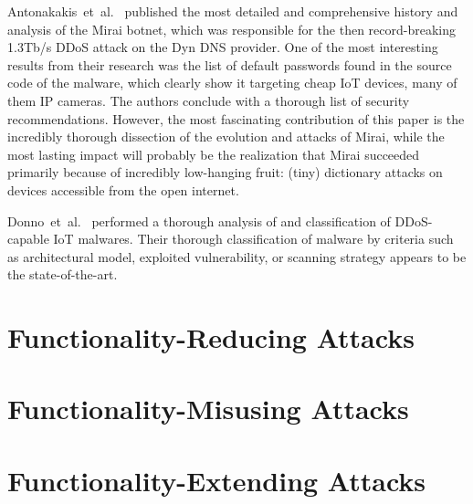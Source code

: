 \documentclass[11pt,a4paper]{article}
\begin{document}
	Antonakakis~et~al.~\cite{Antonakakis:2017:UMB} %
	published the most detailed and comprehensive history and analysis of the Mirai botnet, which was responsible for the then record-breaking 1.3Tb/s DDoS attack on the Dyn DNS provider.
	One of the most interesting results from their research was the list of default passwords found in the source code of the malware, which clearly show it targeting cheap IoT devices, many of them IP cameras.
	The authors conclude with a thorough list of security recommendations.
	However, the most fascinating contribution of this paper is the incredibly thorough dissection of the evolution and attacks of Mirai, while the most lasting impact will probably be the realization that Mirai succeeded primarily because of incredibly low-hanging fruit: (tiny) dictionary attacks on devices accessible from the open internet.

	Donno~et~al.~\cite{Donno:2017:ADIM} %
	performed a thorough analysis of and classification of DDoS-capable IoT malwares.
	Their thorough classification of malware by criteria such as architectural model, exploited vulnerability, or scanning strategy appears to be the state-of-the-art.

	\section{Functionality-Reducing Attacks}%
	\label{sec:functionality_reducing_attacks}


	\section{Functionality-Misusing Attacks}%
	\label{sec:functionality_misusing_attacks}

	\section{Functionality-Extending Attacks}%
	\label{sec:functionality_extending_attacks}



	
	
\end{document}
